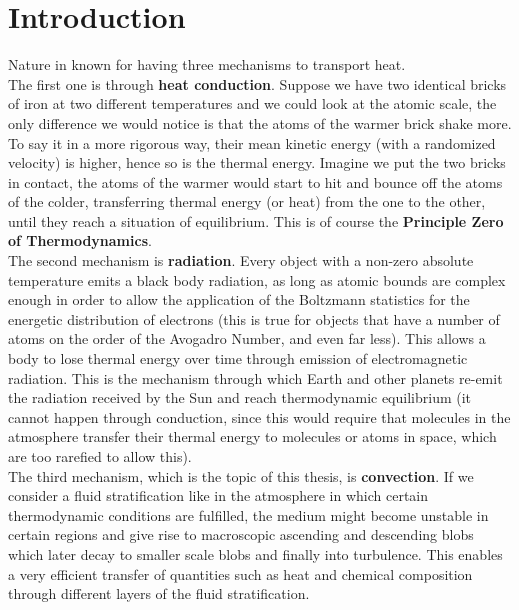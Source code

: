 

\chapter{Introduction}
Nature in known for having three mechanisms to transport heat.  \\
The first one is through \textbf{heat conduction}. Suppose we have two identical bricks of iron at two different temperatures and we could look at the atomic scale, the only difference we would notice is that the atoms of the warmer brick shake more. To say it in a more rigorous way, their mean kinetic energy (with a randomized velocity) is higher, hence so is the thermal energy. Imagine we put the two bricks in contact, the atoms of the warmer would start to hit and bounce off the atoms of the colder, transferring thermal energy (or heat) from the one to the other, until they reach a situation of equilibrium. This is of course the \textbf{Principle Zero of Thermodynamics}. \\
The second mechanism is \textbf{radiation}. Every object with a non-zero absolute temperature emits a black body radiation, as long as atomic bounds are complex enough in order to allow the application of the Boltzmann statistics for the energetic distribution of electrons (this is true for objects that have a number of atoms on the order of the Avogadro Number, and even far less). This allows a body to lose thermal energy over time through emission of electromagnetic radiation. This is the mechanism through which Earth and other planets re-emit the radiation received by the Sun and reach thermodynamic equilibrium (it cannot happen through conduction, since this would require that molecules in the atmosphere transfer their thermal energy to molecules or atoms in space, which are too rarefied to allow this). \\
The third mechanism, which is the topic of this thesis, is \textbf{convection}. If we consider a fluid stratification like in the atmosphere in which certain thermodynamic conditions are fulfilled, the medium might become unstable in certain regions and give rise to macroscopic ascending and descending blobs which later decay to smaller scale blobs and finally into turbulence. This enables a very efficient transfer of quantities such as heat and chemical composition through different layers of the fluid stratification. \\
